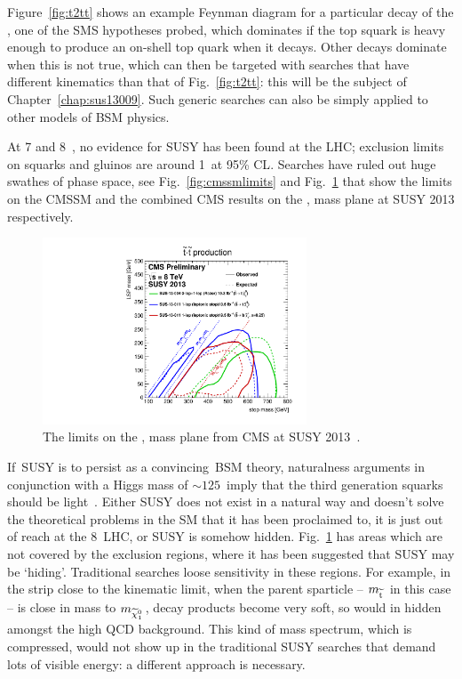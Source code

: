 Figure~\ref{fig:t2tt} shows an example Feynman diagram for a particular decay of the \sTop, 
one of the \ac{SMS} hypotheses probed, 
which dominates if the top squark is heavy enough to produce an on-shell top quark when it decays.
Other decays dominate when this is not true, which can then be targeted with searches that have different kinematics than that of Fig.~\ref{fig:t2tt}: this will be the subject of Chapter~\ref{chap:sus13009}.
Such generic searches can also be simply applied to other models of \ac{BSM} physics.


At 7 and 8~\TeV, no evidence for \ac{SUSY} has been found at the \ac{LHC};
exclusion limits on squarks and gluinos are around 1~\TeV at 95\% \ac{CL}.
Searches have ruled out huge swathes of phase space, see Fig.~\ref{fig:cmssmlimits} and Fig.~\ref{fig:susy2013stop} that show the limits on the \ac{CMSSM} and the combined \ac{CMS} results on the \sTop, \chiOneZero mass plane at SUSY 2013 respectively.

\begin{figure}[t!]
  \begin{center}
  \includegraphics[width=0.7\textwidth]{Figures/theory/SUSY2013T2ttT6.pdf}
  \caption{The limits on the \sTop, \chiOneZero mass plane from \ac{CMS} at SUSY 2013~\cite{tw:SUSY2013T2tt}.}
  \label{fig:susy2013stop}
  \end{center}
\end{figure}


If~\ac{SUSY} is to persist as a convincing~\ac{BSM} theory, 
naturalness arguments in conjunction with a Higgs mass of $\sim 125$~\GeV imply that the third generation squarks should be light~\cite{natSUSYhiggs}.
Either \ac{SUSY} does not exist in a natural way and doesn't solve the theoretical problems in the \ac{SM} that it has been proclaimed to, it is just out of reach at the 8~\TeV \ac{LHC}, or \ac{SUSY} is somehow hidden.
Fig.~\ref{fig:susy2013stop} has areas which are not covered by the exclusion regions, 
where it has been suggested that \ac{SUSY} may be `hiding'. 
Traditional searches loose sensitivity in these regions.
For example, in the strip close to the kinematic limit, 
when the parent sparticle -- $m_{\widetilde{{\rm t}}\,}$ in this case -- is close in mass to $m_{\widetilde{\chi}^{0}_{1}\,}$,
decay products become very soft, so would in hidden amongst the high \ac{QCD} background.
This kind of mass spectrum, which is compressed, would not show up in the traditional \ac{SUSY} searches that demand lots of visible energy: 
a different approach is necessary.


